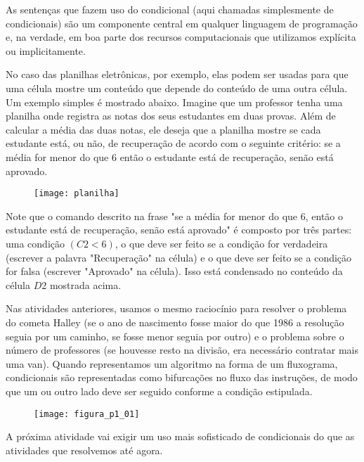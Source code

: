 As sentenças que fazem uso do condicional (aqui chamadas simplesmente de condicionais) são um componente central em qualquer linguagem de programação e, na verdade, em boa parte dos recursos computacionais que utilizamos explícita ou implicitamente.

No caso das planilhas eletrônicas, por exemplo, elas podem ser usadas para que uma célula mostre um conteúdo que depende do conteúdo de uma outra célula. Um exemplo simples é mostrado abaixo. Imagine que um professor tenha uma planilha onde registra as notas dos seus estudantes em duas provas. Além de calcular a média das duas notas, ele deseja que a planilha mostre se cada estudante está, ou não, de recuperação de acordo com o seguinte critério: se a média for menor do que $6$ então o estudante está de recuperação, senão está aprovado.

\begin{figure}[H]
\centering

\texttt{[image: planilha]}
\end{figure}

Note que o comando descrito na frase "se a média for menor do que 6, então o estudante está de recuperação, senão está aprovado"{} é composto por três partes: uma condição $(C2<6)$, o que deve ser feito se a condição for verdadeira (escrever a palavra "Recuperação"{} na célula) e o que deve ser feito se a condição for falsa (escrever "Aprovado"{} na célula). Isso está condensado no conteúdo da célula $D2$ mostrada acima.

Nas atividades anteriores, usamos o mesmo raciocínio para resolver o problema do cometa Halley (se o ano de nascimento fosse maior do que 1986 a resolução seguia por um caminho, se fosse menor seguia por outro) e o problema sobre o número de professores (se houvesse resto na divisão, era necessário contratar mais uma van). Quando representamos um algoritmo na forma de um fluxograma, condicionais são representadas como bifurcações no fluxo das instruções, de modo que um ou outro lado deve ser seguido conforme a condição estipulada.

\begin{figure}[H]
\centering

\texttt{[image: figura\_p1\_01]}
\end{figure}

A próxima atividade vai exigir um uso mais sofisticado de condicionais do que as atividades que resolvemos até agora.


